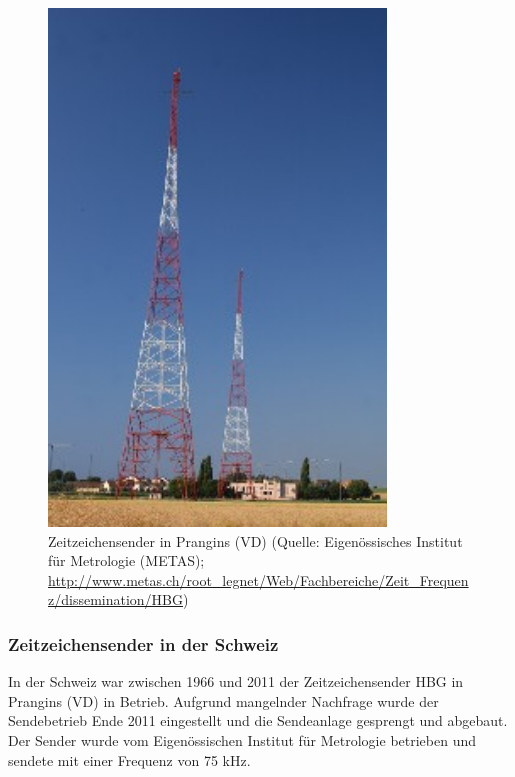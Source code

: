 \begin{figure}
  \vspace{-20pt}
  \centering
    \includegraphics[width=0.8\textwidth]{./images/Analyse/Prangings_VD_CH.jpg}
  \caption[Zeitzeichensender in Prangins (VD)]{Zeitzeichensender in Prangins (VD) (Quelle: Eigenössisches Institut für Metrologie (METAS); \url{http://www.metas.ch/root_legnet/Web/Fachbereiche/Zeit_Frequenz/dissemination/HBG})} 
\end{figure}

\subsubsection{Zeitzeichensender in der Schweiz}

In der Schweiz war zwischen 1966 und 2011 der Zeitzeichensender HBG in Prangins (VD) in Betrieb. Aufgrund mangelnder Nachfrage wurde der Sendebetrieb Ende 2011 eingestellt und die Sendeanlage gesprengt und abgebaut. Der Sender wurde vom Eigenössischen Institut für Metrologie betrieben und sendete mit einer Frequenz von 75 kHz.

